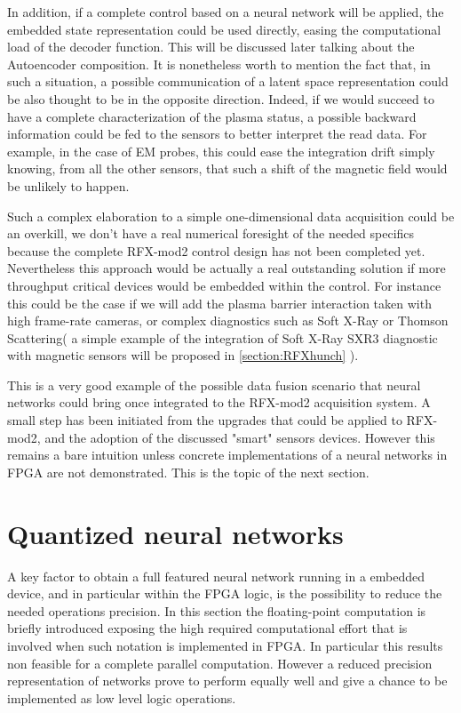 In addition, if a complete control based on a neural network will be applied, the embedded state representation could be used directly, easing the computational load of the decoder function. This will be discussed later talking about the Autoencoder composition.
It is nonetheless worth to mention the fact that, in such a situation, a possible communication of a latent space representation could be also thought to be in the opposite direction. Indeed, if we would succeed to have a complete characterization of the plasma status, a possible backward information could be fed to the sensors to better interpret the read data.
For example, in the case of EM probes, this could ease the integration drift simply knowing, from all the other sensors, that such a shift of the magnetic field would be unlikely to happen.

Such a complex elaboration to a simple one-dimensional data acquisition could be an overkill, we don't have a real numerical foresight of the needed specifics because the complete RFX-mod2 control design has not been completed yet.
Nevertheless this approach would be actually a real outstanding solution if more throughput critical devices would be embedded within the control. For instance this could be the case if we will add the plasma barrier interaction taken with high frame-rate cameras, or complex diagnostics such as Soft X-Ray or Thomson Scattering( a simple example of the integration of Soft X-Ray SXR3 diagnostic with magnetic sensors will be proposed in \cref{section:RFXhunch} ).

This is a very good example of the possible data fusion scenario that neural networks could bring once integrated to the RFX-mod2 acquisition system.
A small step has been initiated from the upgrades that could be applied to RFX-mod2, and the adoption of the discussed "smart" sensors devices.
However this remains a bare intuition unless concrete implementations of a neural networks in FPGA are not demonstrated.
This is the topic of the next section.








%
\section{Quantized neural networks}
\label{section:quantum}

A key factor to obtain a full featured neural network running in a embedded device, and in particular within the FPGA logic, is the possibility to reduce the needed operations precision. In this section the floating-point computation is briefly introduced exposing the high required computational effort that is involved when such notation is implemented in FPGA. In particular this results non feasible for a complete parallel computation. However a reduced precision representation of networks prove to perform equally well and give a chance to be implemented as low level logic operations.

